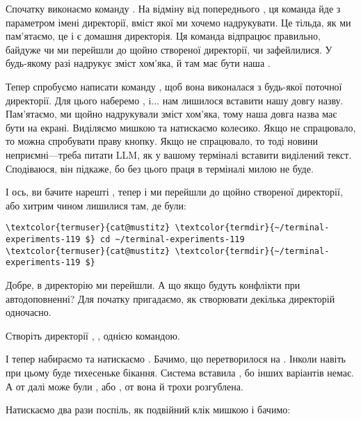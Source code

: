 Спочатку виконаємо команду .
На відміну від попереднього , ця команда йде з параметром імені директорії,
вміст якої ми хочемо надрукувати.
Це тільда, як ми пам'ятаємо, це і є домашня директорія.
Ця команда відпрацює правильно, байдуже чи ми перейшли до щойно створеної директорії, чи зафейлилися.
У будь-якому разі  надрукує зміст хом'яка,
й там має бути наша .

Тепер спробуємо написати команду , щоб вона виконалася з будь-якої поточної директорії.
Для цього наберемо , i... нам лишилося вставити нашу довгу назву.
Пам'ятаємо, ми щойно надрукували зміст хом'яка, тому наша довга назва має бути на екрані.
Виділяємо мишкою та натискаємо колесико.
Якщо не спрацювало, то можна спробувати праву кнопку.
Якщо не спрацювало, то тоді новини неприємні---треба питати LLM, як у вашому терміналі вставити виділений текст.
Сподіваюся, він підкаже, бо без цього праця в терміналі милою не буде.

І ось, ви бачите нарешті ,
тепер \keys{\return} і ми перейшли до щойно створеної директорії,
або хитрим чином лишилися там, де були:

\begin{Verbatim}[fontsize=\footnotesize,commandchars=\\\{\},xleftmargin=\parindent]
\textcolor{termuser}{cat@mustitz} \textcolor{termdir}{~/terminal-experiments-119 $} cd ~/terminal-experiments-119
\textcolor{termuser}{cat@mustitz} \textcolor{termdir}{~/terminal-experiments-119 $}
\end{Verbatim}

Добре, в директорію ми перейшли.
А що якщо будуть конфлікти при автодоповненні?
Для початку пригадаємо, як створювати декілька директорій одночасно.

\begin{exercise}
Створіть директорії , ,  однією командою.
\end{exercise}

І тепер набираємо  та натискаємо \keys{\tab}.
Бачимо, що  перетворилося на .
Інколи навіть при цьому буде тихесеньке бікання.
Система вставила , бо інших варіантів немає.
А от далі може були ,  або , от вона й трохи розгублена.

Натискаємо \keys{\tab} два рази поспіль, як подвійний клік мишкою і бачимо:


